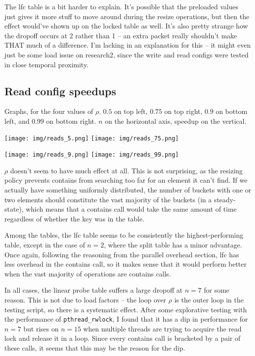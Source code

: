 \documentclass{article}
\begin{document}
The lfc table is a bit harder to explain. It's possible that the preloaded values just gives it more stuff to move around during the resize operations, but then the effect would've shown up on the locked table as well. It's also pretty strange how the dropoff occurs at 2 rather than 1 -- an extra packet really shouldn't make THAT much of a difference. I'm lacking in an explanation for this -- it might even just be some load issue on research2, since the write and read configs were tested in close temporal proximity. 
\subsection*{Read config speedups}
Graphs, for the four values of $\rho$. $0.5$ on top left, $0.75$ on top right, $0.9$ on bottom left, and $0.99$ on bottom right. $n$ on the horizontal axis, speedup on the vertical.

\texttt{[image: img/reads\_5.png]}
\texttt{[image: img/reads\_75.png]}

\texttt{[image: img/reads\_9.png]}
\texttt{[image: img/reads\_99.png]}

$\rho$ doesn't seem to have much effect at all. This is not surprising, as the resizing policy prevents contains from searching too far for an element it can't find. If we actually have something uniformly distributed, the number of buckets with one or two elements should constitute the vast majority of the buckets (in a steady-state), which means that a contains call would take the same amount of time regardless of whether the key was in the table.

Among the tables, the lfc table seems to be consistently the highest-performing table, except in the case of $n=2$, where the split table has a minor advantage. Once again, following the reasoning from the parallel overhead section, lfc has less overhead in the contains call, so it makes sense that it would perform better when the vast majority of operations are contains calls.

In all cases, the linear probe table suffers a large dropoff at $n=7$ for some reason. This is not due to load factors -- the loop over $\rho$ is the outer loop in the testing script, so there is a systematic effect. After some explorative testing with the performance of \verb|pthread_rwlock|, I found that it has a dip in performance for $n=7$ but rises on $n=15$ when multiple threads are trying to acquire the read lock and release it in a loop. Since every contains call is bracketed by a pair of these calls, it seems that this may be the reason for the dip.
\end{document}
